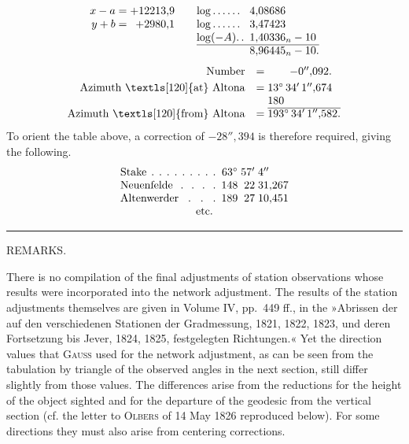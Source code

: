 \[
\begin{array}{@{}r@{\;=\;}r@{\qquad}l@{\enspace}l@{}}
 x-a&+12213{,}9&\log.\,.\,.\,.\,.\,.&4{,}08686\\
 y+b&+2980{,}1&\log.\,.\,.\,.\,.\,.&3{,}47423\\
 \multicolumn{2}{c}{}&\log(-A).\, .&1{,}40336_n-10\\
 \cline{3-4}
 \multicolumn{2}{c}{}&&8{,}96445_n-10.
\end{array}
\]
\[
\begin{array}{@{}r@{\quad}c@{\;}l@{}}
 \text{Number}&=&\qquad-0''{,}092.\\[3pt]
 \text{Azimuth \textls[120]{at} Altona}&=&13^\circ\,34'\,1''{,}674\\
 &&180\\
 \cline{3-3}
 \text{Azimuth \textls[120]{from} Altona}&=&193^\circ\,34'\,1''{,}582.
\end{array}
\]
\indent To orient the table above, a correction of \(-28''{,}394\) is therefore required, giving the following.
\[
\begin{array}{@{}l@{\enspace}r@{\;}r@{\;}l@{}}
 \text{\hbox to 8.7em{Stake\hfil.\hfil.\hfil.\hfil.\hfil.\hfil.\hfil.\hfil.\hfil.}}&63^\circ&57'&4''\\
 \text{\hbox to 8.7em{Neuenfelde\hfil.\hfil.\hfil.\hfil.}}&148&22&31{,}267\\
 \text{\hbox to 8.7em{Altenwerder\hfil.\hfil.\hfil.}}&189&27&10{,}451\\
 \multicolumn{4}{c}{\text{etc.}}
\end{array}
\]

\begin{center}\rule{3cm}{.4pt}\end{center}
\vspace{.8cm}
\begingroup\small
\begin{center}
 REMARKS.
\end{center}

There is no compilation of the final adjustments of station observations whose results were incorporated into the network adjustment. The results of the station adjustments themselves are given in Volume IV, pp.~449 ff., in the »Abrissen der auf den verschiedenen Stationen der Gradmessung, 1821, 1822, 1823, und deren Fortsetzung bis Jever, 1824, 1825, festgelegten Richtungen.« Yet the direction values that \textsc{Gauss} used for the network adjustment, as can be seen from the tabulation by triangle of the observed angles in the next section, still differ slightly from those values. The differences arise from the reductions for the height of the object sighted and for the departure of the geodesic from the vertical section (cf. the letter to \textsc{Olbers} of 14 May 1826 reproduced below). For some directions they must also arise from centering corrections.


